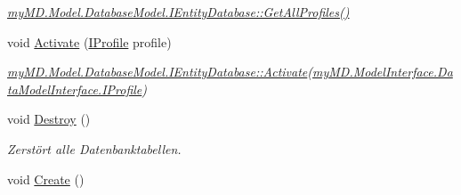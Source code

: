 \begin{CompactItemize}
\begin{CompactList}\small\item\em \hyperlink{interfacemy_m_d_1_1_model_1_1_database_model_1_1_i_entity_database_cdd42df8b8413bdd0cd36422d4e3f33c}{my\-MD.Model.Database\-Model.IEntity\-Database::Get\-All\-Profiles()} \item\end{CompactList}\item 
\hypertarget{classmy_m_d_1_1_model_1_1_database_model_1_1_entity_database_6ffa7bbff9bc4db881433251a158fbd0}{
void \hyperlink{classmy_m_d_1_1_model_1_1_database_model_1_1_entity_database_6ffa7bbff9bc4db881433251a158fbd0}{Activate} (\hyperlink{interfacemy_m_d_1_1_model_interface_1_1_data_model_interface_1_1_i_profile}{IProfile} profile)}
\label{dd/d77/classmy_m_d_1_1_model_1_1_database_model_1_1_entity_database_6ffa7bbff9bc4db881433251a158fbd0}

\begin{CompactList}\small\item\em \hyperlink{interfacemy_m_d_1_1_model_1_1_database_model_1_1_i_entity_database_6ffa7bbff9bc4db881433251a158fbd0}{my\-MD.Model.Database\-Model.IEntity\-Database::Activate}(\hyperlink{interfacemy_m_d_1_1_model_interface_1_1_data_model_interface_1_1_i_profile}{my\-MD.Model\-Interface.Data\-Model\-Interface.IProfile}) \item\end{CompactList}\item 
\hypertarget{classmy_m_d_1_1_model_1_1_database_model_1_1_entity_database_4b5d559a49b5a7b7cedeeb423ea1a820}{
void \hyperlink{classmy_m_d_1_1_model_1_1_database_model_1_1_entity_database_4b5d559a49b5a7b7cedeeb423ea1a820}{Destroy} ()}
\label{dd/d77/classmy_m_d_1_1_model_1_1_database_model_1_1_entity_database_4b5d559a49b5a7b7cedeeb423ea1a820}

\begin{CompactList}\small\item\em Zerst\"{o}rt alle Datenbanktabellen. \item\end{CompactList}\item 
\hypertarget{classmy_m_d_1_1_model_1_1_database_model_1_1_entity_database_0b896841bdafdcc8d4bf2997716bcc87}{
void \hyperlink{classmy_m_d_1_1_model_1_1_database_model_1_1_entity_database_0b896841bdafdcc8d4bf2997716bcc87}{Create} ()}
\label{dd/d77/classmy_m_d_1_1_model_1_1_database_model_1_1_entity_database_0b896841bdafdcc8d4bf2997716bcc87}


\end{CompactItemize}

